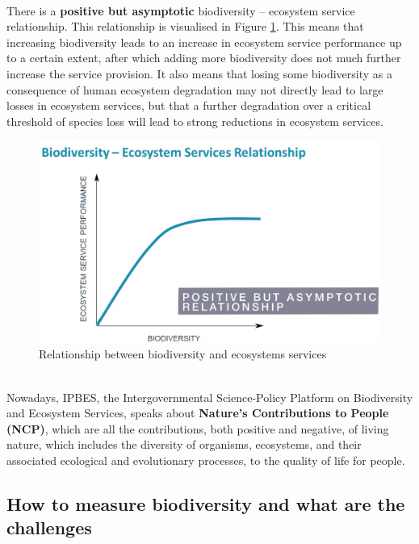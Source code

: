 \documentclass[../summary.tex]{subfiles}
\begin{document}
	\newpage
	\ \\
	There is a \textbf{positive but asymptotic} biodiversity – ecosystem service relationship. This relationship is visualised in Figure \ref{fig:relationship_biodiversity_ecosystems_services}. This means that increasing biodiversity leads to an increase in ecosystem service performance up to a certain extent, after which adding more biodiversity does not much further increase the service provision. It also means that losing some biodiversity as a consequence of human ecosystem degradation may not directly lead to large losses in ecosystem services, but that a further degradation over a critical threshold of species loss will lead to strong reductions in ecosystem services.
	
	\begin{figure}[htbp]
		\centering
		\includegraphics[width=0.9\linewidth]{images/2-biodiversity-ecosystem-services-relationship.png}
		\caption{Relationship between biodiversity and ecosystems services}
		\label{fig:relationship_biodiversity_ecosystems_services}
	\end{figure} 	
	\ \\
	Nowadays, IPBES, the Intergovernmental Science-Policy Platform on Biodiversity and Ecosystem Services, speaks about \textbf{Nature's Contributions to People (NCP)}, which are all the contributions, both positive and negative, of living nature, which includes the diversity of organisms, ecosystems, and their associated ecological and evolutionary processes, to the quality of life for people.
	
	\newpage
	
	\subsection{How to measure biodiversity and what are the challenges}
\end{document}
